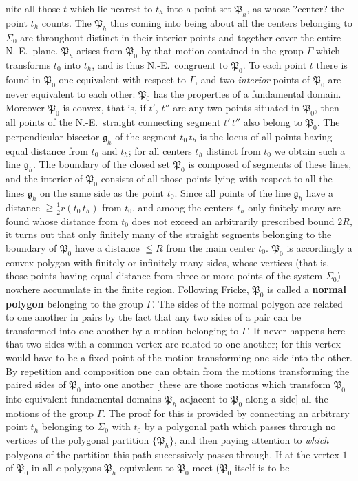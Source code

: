 \documentclass{article}
\begin{document}
nite all those $t$ which lie nearest to $t_h$ into a point set $\mathfrak{P}_h$, as whose ?center? the point $t_h$ counts. The $\mathfrak{P}_h$ thus coming into being about all the centers belonging to $\Sigma_0$ are throughout distinct in their interior points and together cover the entire N.-E.\ plane. $\mathfrak{P}_h$ arises from $\mathfrak{P}_0$ by that motion contained in the group $\varGamma$ which transforms $t_0$ into $t_h$, and is thus N.-E.\ congruent to $\mathfrak{P}_0$. To each point $t$ there is found in $\mathfrak{P}_0$ one equivalent with respect to $\varGamma$, and two \emph{interior} points of $\mathfrak{P}_0$ are never equivalent to each other: $\mathfrak{P}_0$ has the properties of a fundamental domain. Moreover $\mathfrak{P}_0$ is convex, that is, if $t'$, $t''$ are any two points situated in $\mathfrak{P}_0$, then all points of the N.-E.\ straight connecting segment $t'\,t''$ also belong to $\mathfrak{P}_0$. The perpendicular bisector $\mathfrak{g}_h$ of the segment $t_0\,t_h$ is the locus of all points having equal distance from $t_0$ and $t_h$; for all centers $t_h$ distinct from $t_0$ we obtain such a line $\mathfrak{g}_h$. The boundary of the closed set $\mathfrak{P}_0$ is composed of segments of these lines, and the interior of $\mathfrak{P}_0$ consists of all those points lying with respect to all the lines $\mathfrak{g}_h$ on the same side as the point $t_0$. Since all points of the line $\mathfrak{g}_h$ have a distance $\geqq \frac{1}{2} r(t_0\,t_h)$ from $t_0$, and among the centers $t_h$ only finitely many are found whose distance from $t_0$ does not exceed an arbitrarily prescribed bound $2R$, it turns out that only finitely many of the straight segments belonging to the boundary of $\mathfrak{P}_0$ have a distance $\leqq R$ from the main center $t_0$. $\mathfrak{P}_0$ is accordingly a convex polygon with finitely or infinitely many sides, whose vertices (that is, those points having equal distance from three or more points of the system $\Sigma_0$) nowhere accumulate in the finite region. Following Fricke, $\mathfrak{P}_0$ is called a \textbf{normal polygon} belonging to the group $\varGamma$. The sides of the normal polygon are related to one another in pairs by the fact that any two sides of a pair can be transformed into one another by a motion belonging to $\varGamma$. It never happens here that two sides with a common vertex are related to one another; for this vertex would have to be a fixed point of the motion transforming one side into the other. By repetition and composition one can obtain from the motions transforming the paired sides of $\mathfrak{P}_0$ into one another [these are those motions which transform $\mathfrak{P}_0$ into equivalent fundamental domains $\mathfrak{P}_h$ adjacent to $\mathfrak{P}_0$ along a side] all the motions of the group $\varGamma$. The proof for this is provided by connecting an arbitrary point $t_h$ belonging to $\Sigma_0$ with $t_0$ by a polygonal path which passes through no vertices of the polygonal partition $\{\mathfrak{P}_h\}$, and then paying attention to \emph{which} polygons of the partition this path successively passes through. If at the vertex $1$ of $\mathfrak{P}_0$ in all $e$ polygons $\mathfrak{P}_h$ equivalent to $\mathfrak{P}_0$ meet ($\mathfrak{P}_0$ itself is to be 
\end{document}
